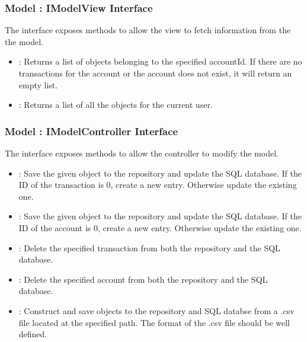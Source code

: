 \documentclass[12pt]{article}
\begin{document}
\subsubsection{Model : IModelView Interface}
The  interface exposes methods to allow the view to fetch information from the the model.\\
\begin{itemize}
	\item {} : Returns a list of  objects belonging to the specified accountId. If there are no transactions for the account or the account does not exist, it will return an empty list.
	\item {} : Returns a list of all the  objects for the current user.
\end{itemize}

\subsubsection{Model : IModelController Interface}
The  interface exposes methods to allow the controller to modify the model.\\
\begin{itemize}
	\item {} : Save the given  object to the repository and update the SQL database. If the ID of the transaction is 0, create a new entry. Otherwise update the existing one.
	\item {} : Save the given  object to the repository and update the SQL database. If the ID of the account is 0, create a new entry. Otherwise update the existing one.
	\item {} : Delete the specified transaction from both the repository and the SQL database.
	\item {} : Delete the specified account from both the repository and the SQL database.
	\item {} : Construct and save  objects to the repository and SQL databse from a .csv file located at the specified path. The format of the .csv file should be well defined.
\end{itemize}
\end{document}
